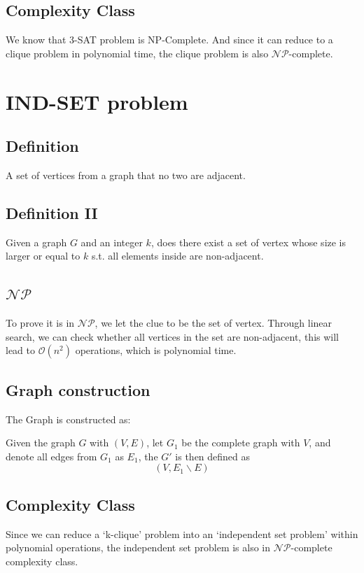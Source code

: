 \documentclass[A4paper]{article}
\begin{document}
\subsection{Complexity Class}
We know that 3-SAT problem is NP-Complete. And since it can reduce to a clique problem in polynomial time, the clique problem is also $\mathcal{NP}$-complete.
\section{IND-SET problem}
\subsection{Definition}
A set of vertices from a graph that no two are adjacent.
\subsection{Definition II}
Given a graph $G$ and an integer $k$, does there exist a set of vertex whose size is larger or equal to $k$ s.t. all elements inside are non-adjacent.
\subsection{$\mathcal{NP}$}
To prove it is in $\mathcal{NP}$, we let the clue to be the set of vertex. Through linear search, we can check whether all vertices in the set are non-adjacent, this will lead to $\mathcal{O}(n^2)$ operations, which is polynomial time. 
\subsection{Graph construction}
The Graph is constructed as: 

Given the graph $G$ with $(V,E)$, let $G_1$ be the complete graph with $V$, and denote all edges from $G_1$ as $E_1$, the $G'$ is then defined as 
\[
	(V, E_1\backslash E)
\]
\subsection{Complexity Class}
Since we can reduce a `k-clique' problem into an `independent set problem' within polynomial operations, the independent set problem is also in $\mathcal{NP}$-complete complexity class.
\end{document}
